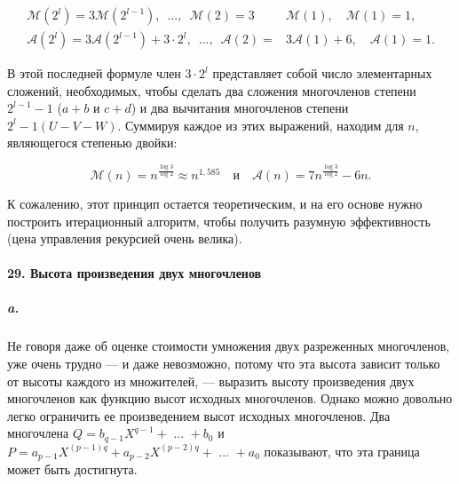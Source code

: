\documentclass{../../template/mai_book}
\begin{document}
\begin{equation*}
	\begin{split}
	\mathcal{M}(2^l) = 3\mathcal{M}(2^{l - 1}), \enspace ..., \enspace \mathcal{M}(2) = 3&\mathcal{M}(1), \quad \mathcal{M}(1) = 1,
	\\
	\mathcal{A}(2^l) = 3\mathcal{A}(2^{l - 1}) + 3 \cdot 2^l, \enspace ..., \enspace \mathcal{A}(2) = &3\mathcal{A}(1) + 6, \quad \mathcal{A}(1) = 1.
	\end{split}
\end{equation*}

\noindent
В этой последней формуле член $3 \cdot 2^l$ представляет собой число элементарных сложений, необходимых, чтобы сделать два сложения многочленов степени $2^{l - 1} - 1$ ($a + b$ и $c + d$) и два вычитания многочленов степени $2^l - 1(U - V - W)$. Суммируя каждое из этих выражений, находим для $n$, являющегося степенью двойки:

\begin{equation*}
\mathcal{M}(n) = n^{\frac{\log 3}{\log 2}} \approx n^{1,585} \quad \text{и} \quad \mathcal{A}(n) = 7n^{\frac{\log 3}{\log 2}} - 6n.
\end{equation*}

\noindent
К сожалению, этот принцип остается теоретическим, и на его основе нужно построить итерационный алгоритм, чтобы получить разумную эффективность (цена управления рекурсией очень велика).

\newpage


\paragraph{29. Высота произведения двух многочленов}

\subparagraph{a.} Не говоря даже об оценке стоимости умножения двух разреженных многочленов, уже очень трудно — и даже невозможно, потому что эта высота зависит только от высоты каждого из множителей, — выразить высоту произведения двух многочленов как функцию высот исходных многочленов. Однако можно довольно легко ограничить ее произведением высот исходных многочленов. Два многочлена $Q = b_{q - 1}X^{q - 1} + \text{ ... } + b_0$ и $P = a_{p - 1}X^{(p - 1)q} + a_{p - 2}X^{(p - 2)q} + \text{ ... } + a_0$ показывают, что эта граница может быть достигнута.
\end{document}
